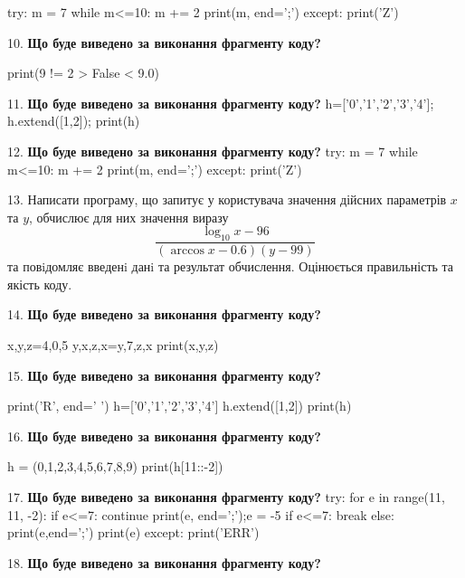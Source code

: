 \documentclass[11pt]{article}
\begin{document}
try:
    m = 7
    while m<=10:
        m += 2
    print(m, end=';')
except:
    print('Z')

\par\vspace{5mm}
10. \textbf{Що буде виведено за виконання фрагменту коду?}

print(9 != 2 > False < 9.0)
\par\vspace{5mm}
11. \textbf{Що буде виведено за виконання фрагменту коду?}
h=['0','1','2','3','4']; h.extend([1,2]); print(h)\par\vspace{5mm}
12. \textbf{Що буде виведено за виконання фрагменту коду?}
try:
    m = 7
    while m<=10:
        m += 2
    print(m, end=';')
except:
    print('Z')
\par\vspace{5mm}
13. 
Написати програму, що запитує у користувача значення дійсних параметрів $x$ та $y$, обчислює для них значення виразу 
$$\frac{\log_{10} x - 96}{(\arccos x - 0.6) (y - 99)}$$ 
та повiдомляє введенi данi та результат обчислення.
 Оцінюється правильність та якість коду.

\par\vspace{5mm}
14. \textbf{Що буде виведено за виконання фрагменту коду?}

x,y,z=4,0,5
y,x,z,x=y,7,z,x
print(x,y,z)
\par\vspace{5mm}
15. \textbf{Що буде виведено за виконання фрагменту коду?}

print('R', end=' ')
h=['0','1','2','3','4']
h.extend([1,2])
print(h)

\par\vspace{5mm}
16. \textbf{Що буде виведено за виконання фрагменту коду?}

h = (0,1,2,3,4,5,6,7,8,9)
print(h[11::-2])

\par\vspace{5mm}
17. \textbf{Що буде виведено за виконання фрагменту коду?}
try:
    for e in range(11, 11, -2):
        if e<=7:
            continue
        print(e, end=';');e = -5
        if e<=7:
            break
    else:
        print(e,end=';')
    print(e)
except:
    print('ERR')
\par\vspace{5mm}
18. \textbf{Що буде виведено за виконання фрагменту коду?}
\end{document}
